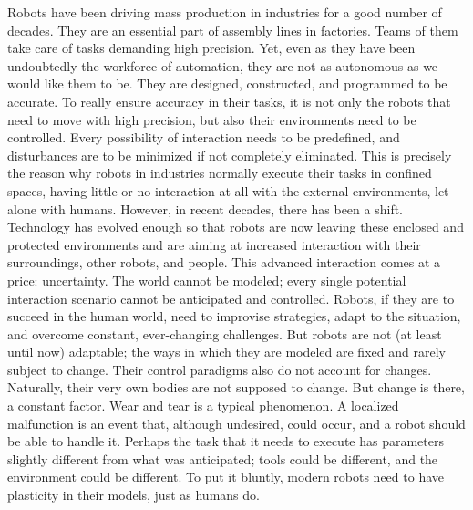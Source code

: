 Robots have been driving mass production in industries for a good number of decades. They are an essential part of assembly lines in factories. Teams of them take care of tasks demanding high precision. Yet, even as they have been undoubtedly the workforce of automation, they are not as autonomous as we would like them to be. They are designed, constructed, and programmed to be accurate. To really ensure accuracy in their tasks, it is not only the robots that need to move with high precision, but also their environments need to be controlled. Every possibility of interaction needs to be predefined, and disturbances are to be minimized if not completely eliminated. This is precisely the reason why robots in industries normally execute their tasks in confined spaces, having little or no interaction at all with the external environments, let alone with humans. However, in recent decades, there has been a shift. Technology has evolved enough so that robots are now leaving these enclosed and protected environments and are aiming at increased interaction with their surroundings, other robots, and people. This advanced interaction comes at a price: uncertainty. The world cannot be modeled; every single potential interaction scenario cannot be anticipated and controlled. Robots, if they are to succeed in the human world, need to improvise strategies, adapt to the situation, and overcome constant, ever-changing challenges. But robots are not (at least until now) adaptable; the ways in which they are modeled are fixed and rarely subject to change. Their control paradigms also do not account for changes. Naturally, their very own bodies are not supposed to change. But change is there, a constant factor. Wear and tear is a typical phenomenon. A localized malfunction is an event that, although undesired, could occur, and a robot should be able to handle it. Perhaps the task that it needs to execute has parameters slightly different from what was anticipated; tools could be different, and the environment could be different. To put it bluntly, modern robots need to have plasticity in their models, just as humans do.

